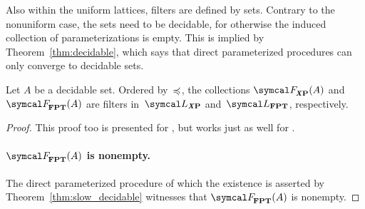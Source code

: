 Also within the uniform lattices, filters are defined by sets.
Contrary to the nonuniform case, the sets need to be decidable, for otherwise the induced collection of parameterizations is empty.
This is implied by Theorem~\ref{thm:decidable}, which says that direct parameterized procedures can only converge to decidable sets.
\begin{theorem}
\label{thm:filter}%
  Let $A$ be a decidable set.
  Ordered by~$\preccurlyeq$, the collections $\calF_\clX{P}(A)$ and $\calF_\cl{FPT}(A)$ are filters in~$\calL_\clX{P}$ and~$\calL_\cl{FPT}$, respectively.
\end{theorem}
\begin{proof}
  This proof too is presented for , but works just as well for .

  \paragraph{$\calF_\cl{FPT}(A)$ is nonempty.}
  The direct parameterized procedure of which the existence is asserted by Theorem~\ref{thm:slow_decidable} witnesses that $\calF_\cl{FPT}(A)$ is nonempty.


\end{proof}
